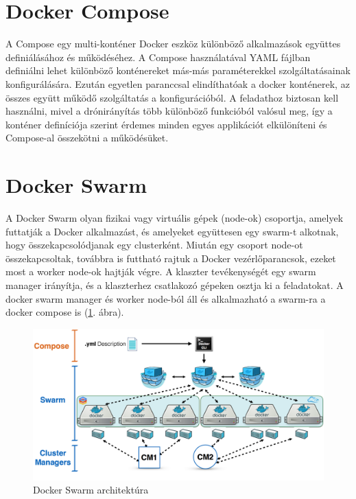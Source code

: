 \section{Docker Compose}
A Compose egy multi-konténer Docker eszköz különböző alkalmazások együttes definiálásához és működéséhez. A Compose használatával YAML fájlban definiálni lehet különböző konténereket más-más paraméterekkel szolgáltatásainak konfigurálására. Ezután egyetlen paranccsal elindíthatóak a docker konténerek, az összes együtt működő szolgáltatás a konfigurációból. \cite{compose} A feladathoz biztosan kell használni, mivel a drónirányítás több különböző funkcióból valósul meg, így a konténer definíciója szerint érdemes minden egyes applikációt elkülöníteni és Compose-al összekötni a működésüket.

\section{Docker Swarm}
A Docker Swarm olyan fizikai vagy virtuális gépek (node-ok) csoportja, amelyek futtatják a Docker alkalmazást, és amelyeket együttesen egy swarm-t alkotnak, hogy összekapcsolódjanak egy clusterként. Miután egy csoport node-ot összekapcsoltak, továbbra is futtható rajtuk a Docker vezérlőparancsok, ezeket most a worker node-ok hajtják végre. A klaszter tevékenységét egy swarm manager irányítja, és a klaszterhez csatlakozó gépeken osztja ki a feladatokat. A docker swarm manager és worker node-ból áll és alkalmazható a swarm-ra a docker compose is (\ref{fig:swarm}. ábra).
\begin{figure}
	\centering
	\includegraphics[width=\linewidth]{figures/swarm.png}
	\caption{Docker Swarm architektúra \cite{docker-swarm}}
	\label{fig:swarm}
\end{figure}

